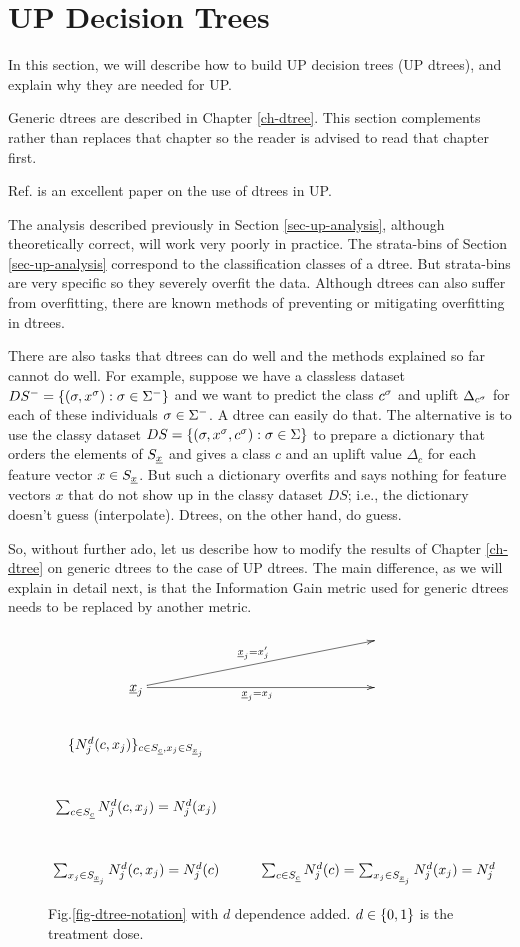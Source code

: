 \section{UP Decision Trees}

In this section,
we will describe
how to build UP decision trees (UP dtrees),
and explain why they are needed
for UP.

Generic dtrees are 
described in Chapter \ref{ch-dtree}.
This section 
complements rather than replaces
that chapter so the reader
is advised to read
that chapter first.

Ref.\cite{jaros} is an excellent paper on the use of
dtrees in UP.


The
analysis described
previously in  
Section
\ref{sec-up-analysis},
although theoretically correct,
will work very poorly in practice.
The strata-bins
of Section
\ref{sec-up-analysis}
correspond to
the classification
classes of a dtree.
But strata-bins are very
specific so they  
severely overfit the data.
Although dtrees 
can also suffer from overfitting,
there are known methods of 
preventing or mitigating overfitting in dtrees.

There are also tasks 
that dtrees 
can do well
and the methods
explained so far
cannot do well.
For example,
suppose we have 
a classless
dataset $DS^-=\{(\sigma, x^\sigma):\sigma\in \Sigma^-\}$
and we want to predict
the class $c^\sigma$ and
uplift $\Delta_{c^\sigma}$
for each of these individuals 
$\sigma\in \Sigma^-$.
A dtree can easily
do that. The alternative
is to use the classy dataset 
$DS=\{(\sigma, x^\sigma, c^\sigma):\sigma\in \Sigma\}$
to
prepare a dictionary
that orders
the elements
of $S_{\underline{x}}$ and gives a
class $c$ and an uplift value
$\Delta_c$ for each
feature vector $x\in S_{\underline{x}}$.
But
such a dictionary overfits
and says nothing for 
feature vectors $x$
that do not show up in 
the classy dataset $DS$; i.e., the
dictionary 
doesn't guess (interpolate). Dtrees,
on the other hand, do
guess.

So, without further ado,
let us describe how to
modify the results
of Chapter \ref{ch-dtree}
on generic dtrees
to the case of UP dtrees.
The main difference,
as we will
explain in detail
next,
is that the Information
Gain metric
used for generic dtrees
needs to be replaced
by another metric.






\begin{figure}[h!]
$$
\xymatrix{
&
\\
\rvx_j\ar[r]_{\rvx_j=x_j}
\ar[ru]^{\rvx_j=x_j'}&
\\
\{N^d_j(c,x_j)\}_{c\in S_\rvc, x_j\in S_{\rvx_j}}
\\
\sum_{c\in S_\rvc}N^d_j(c,x_j)=N^d_j(x_j)
\\
\sum_{x_j\in S_{\rvx_j}}N^d_j(c,x_j)=N^d_j(c)
&
\sum_{c\in S_\rvc}N^d_j(c)=
\sum_{x_j\in S_{\rvx_j}}N^d_j(x_j)=N^d_j
}
$$
\caption{Fig.\ref{fig-dtree-notation}
 with $d$ dependence added.
$d\in \{0,1\}$
is the treatment dose.
} 
\label{fig-dtree-notation-uplift}
\end{figure}

